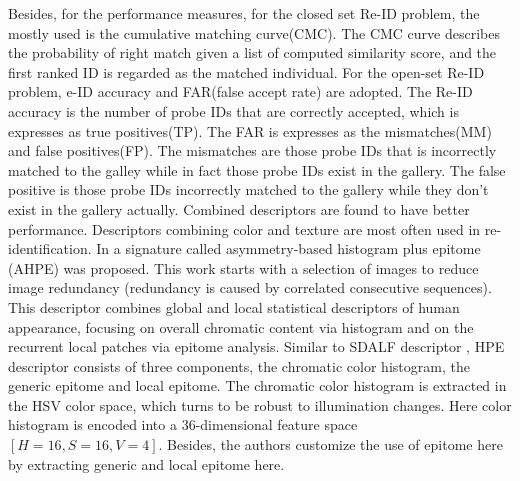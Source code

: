 Besides, for the performance measures, for the closed set Re-ID problem, the mostly used is the cumulative matching curve(CMC). The CMC curve describes the probability of right match given a list of computed similarity score, and the first ranked ID is regarded as the matched individual. For the open-set Re-ID problem, e-ID accuracy and FAR(false accept rate) are adopted. The Re-ID accuracy is the number of probe IDs that are correctly accepted, which is expresses as true positives(TP). The FAR is expresses as the mismatches(MM) and false positives(FP). The mismatches are those probe IDs that is incorrectly matched to the galley while in fact those probe IDs exist in the gallery. The false positive is those probe IDs incorrectly matched to the gallery while they don't exist in the gallery actually.
Combined descriptors are found to have better performance. Descriptors combining color and texture are most often used in re-identification. In \cite{AppBasedREID} a signature called asymmetry-based histogram plus epitome (AHPE) was proposed. This work starts with a selection of images to reduce image redundancy (redundancy is caused by correlated consecutive sequences). This descriptor combines global and local statistical descriptors of human appearance, focusing on overall chromatic content via histogram and on the recurrent local patches via epitome analysis. Similar to SDALF descriptor \cite{SDALF}, HPE descriptor consists of three components, the chromatic color histogram, the generic epitome and local epitome. The chromatic color histogram is extracted in the HSV color space, which turns to be robust to illumination changes. Here color histogram is encoded into a 36-dimensional feature space $[H=16,  S=16,  V=4]$. Besides, the authors customize the use of epitome here by extracting generic and local epitome here. 

